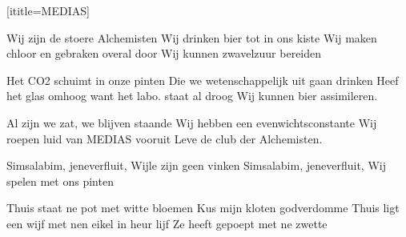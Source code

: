  [ititle={MEDIAS}]

\beginverse
Wij zijn de stoere Alchemisten
Wij drinken bier tot in ons kiste
Wij maken chloor en gebraken overal door
Wij kunnen zwavelzuur bereiden
\endverse

\beginverse
Het CO2 schuimt in onze pinten
Die we wetenschappelijk uit gaan drinken
Heef het glas omhoog want het labo. staat al droog
Wij kunnen bier assimileren.
\endverse

\beginverse
Al zijn we zat, we blijven staande
Wij hebben een evenwichtsconstante
Wij roepen luid van MEDIAS vooruit
Leve de club der Alchemisten.
\endverse

\beginverse
Simsalabim, jeneverfluit,
Wijle zijn geen vinken
Simsalabim, jeneverfluit,
Wij spelen met ons pinten
\endverse

\beginverse
Thuis staat ne pot met witte bloemen
Kus mijn kloten godverdomme
Thuis ligt een wijf met nen eikel in heur lijf
Ze heeft gepoept met ne zwette
\endverse
\endsong